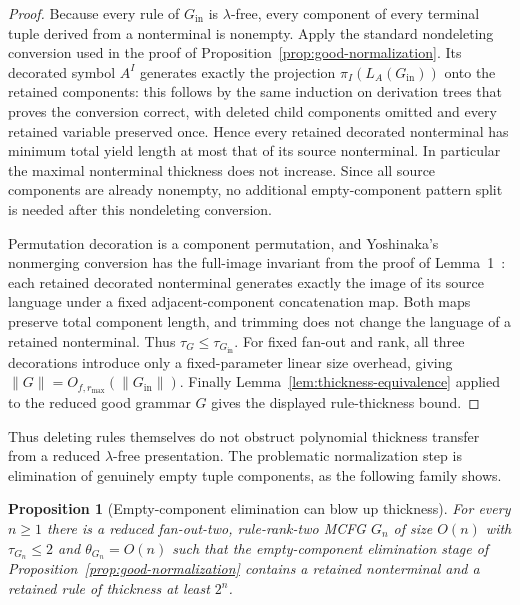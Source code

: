 \documentclass[11pt]{article}
\numberwithin{equation}{section}
\theoremstyle{plain}
\newtheorem{proposition}[theorem]{Proposition}
\theoremstyle{definition}
\theoremstyle{remark}
\begin{document}
\begin{proof}
Because every rule of $G_{\mathrm{in}}$ is $\lambda$-free, every component of
every terminal tuple derived from a nonterminal is nonempty.  Apply the
standard nondeleting conversion used in the proof of
Proposition~\ref{prop:good-normalization}.  Its decorated symbol $A^I$
generates exactly the projection $\pi_I(L_A(G_{\mathrm{in}}))$ onto the retained
components: this follows by the same induction on derivation trees that proves
the conversion correct, with deleted child components omitted and every
retained variable preserved once.  Hence every retained decorated
nonterminal has minimum total yield length at most that of its source
nonterminal.  In particular the maximal nonterminal thickness does not
increase.  Since all source components are already nonempty, no additional
empty-component pattern split is needed after this nondeleting conversion.

Permutation decoration is a component permutation, and Yoshinaka's
nonmerging conversion has the full-image invariant from the proof of
Lemma~1~\cite[Section~2.3, Lemma~1]{Yoshinaka2011}: each retained decorated
nonterminal generates exactly the image of its source language under a fixed
adjacent-component concatenation map.  Both maps preserve total component
length, and trimming does not change the language of a retained nonterminal.
Thus $\tau_G\le\tau_{G_{\mathrm{in}}}$.  For fixed fan-out and rank, all three
decorations introduce only a fixed-parameter linear size overhead, giving
$\|G\|=O_{f,r_{\max}}(\|G_{\mathrm{in}}\|)$.  Finally
Lemma~\ref{lem:thickness-equivalence} applied to the reduced good grammar $G$
gives the displayed rule-thickness bound.
\end{proof}

Thus deleting rules themselves do not obstruct polynomial thickness transfer
from a reduced $\lambda$-free presentation.  The problematic normalization
step is elimination of genuinely empty tuple components, as the following
family shows.

\begin{proposition}[Empty-component elimination can blow up thickness]
\label{prop:empty-component-blowup}
For every $n\ge1$ there is a reduced fan-out-two, rule-rank-two MCFG $G_n$ of
size $O(n)$ with $\tau_{G_n}\le2$ and $\theta_{G_n}=O(n)$ such that the
empty-component elimination stage of Proposition~\ref{prop:good-normalization}
contains a retained nonterminal and a retained rule of thickness at least
$2^n$.
\end{proposition}
\end{document}

